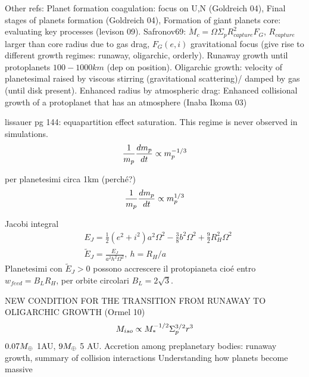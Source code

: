 \begin{workout}
	Other refs: Planet formation coagulation: focus on U,N (Goldreich 04), Final stages of planets formation (Goldreich 04), Formation of giant planets core: evaluating key processes (levison 09).
	Safronov69: $\dot{M}_c=\Omega\Sigma_pR^2_{capture}F_G$, $R_{capture}$ larger than core radius due to gas drag, $F_G(e,i)$ gravitational focus (give rise to different growth regimes: runaway, oligarchic, orderly).
	Runaway growth until protoplanets $100-1000km$ (dep on position).
	Oligarchic growth: velocity of planetesimal raised by viscous stirring (gravitational scattering)/ damped by gas (until disk present).
	Enhanced radius by atmospheric drag: Enhanced collisional growth of a protoplanet that has an atmosphere (Inaba Ikoma 03)
\end{workout}

\begin{workout}
	lissauer pg 144: equapartition effect saturation. This regime is never observed in simulations.
	\begin{equation}
	\frac{1}{m_p}\TDy{t}{m_p}\propto m_p\expy{-1/3}
	\end{equation}
\end{workout}

\begin{workout}
	per planetesimi circa 1km (perch\'e?)
	\begin{equation}
	\frac{1}{m_p}\TDy{t}{m_p}\propto m_p\expy{1/3}
	\end{equation}
\end{workout}

\begin{workout}
	Jacobi integral
	\begin{align}
		&E_J=\frac{1}{2}(e^2+i^2)a^2\Omega^2-\frac{3}{8}b^2\Omega^2+\frac{9}{2}R_H^2\Omega^2\\
		&\tilde{E}_J=\frac{E_J}{a^2h^2\Omega^2},\ h=R_H/a
	\end{align}
	Planetesimi con $\tilde{E}_J>0$ possono accrescere il protopianeta  cio\'e entro $w_{feed}=B_LR_H$, per orbite circolari $B_L=2\sqrt{3 }$.
\end{workout}

\begin{workout}
	NEW CONDITION FOR THE TRANSITION FROM RUNAWAY TO OLIGARCHIC GROWTH (Ormel 10)
	\begin{equation}
	M_{iso}\propto M_*\expy{-1/2}\Sigma_p\expy{3/2}r^3
	\end{equation}
	$0.07\mearth{}$ 1AU, $9\mearth{}$ 5 AU.
	Accretion among preplanetary bodies: runaway growth, summary of collision interactions
	Understanding how planets become massive
\end{workout}

